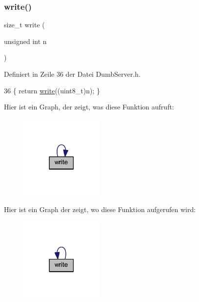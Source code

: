 \subsubsection{\texorpdfstring{write()}{write()}\hspace{0.1cm}{\footnotesize\ttfamily [5/6]}}
{\footnotesize\ttfamily size\+\_\+t write (\begin{DoxyParamCaption}\item[{unsigned int}]{n }\end{DoxyParamCaption})\hspace{0.3cm}{\ttfamily [inline]}}



Definiert in Zeile 36 der Datei Dumb\+Server.\+h.


\begin{DoxyCode}
36 \{ \textcolor{keywordflow}{return} \hyperlink{class_esp_server_a7c66fc8d559f4956d4ccea196299bca7}{write}((uint8\_t)n); \}
\end{DoxyCode}
Hier ist ein Graph, der zeigt, was diese Funktion aufruft\+:\nopagebreak
\begin{figure}[H]
\begin{center}
\leavevmode
\includegraphics[width=117pt]{class_esp_server_a2d9bc6ac05e45a7023be3cd1ca224407_cgraph}
\end{center}
\end{figure}
Hier ist ein Graph der zeigt, wo diese Funktion aufgerufen wird\+:\nopagebreak
\begin{figure}[H]
\begin{center}
\leavevmode
\includegraphics[width=117pt]{class_esp_server_a2d9bc6ac05e45a7023be3cd1ca224407_icgraph}
\end{center}
\end{figure}
\mbox{\label{class_esp_server_a22e7ab55e0aa268cff5b48e763429ec3}} 

